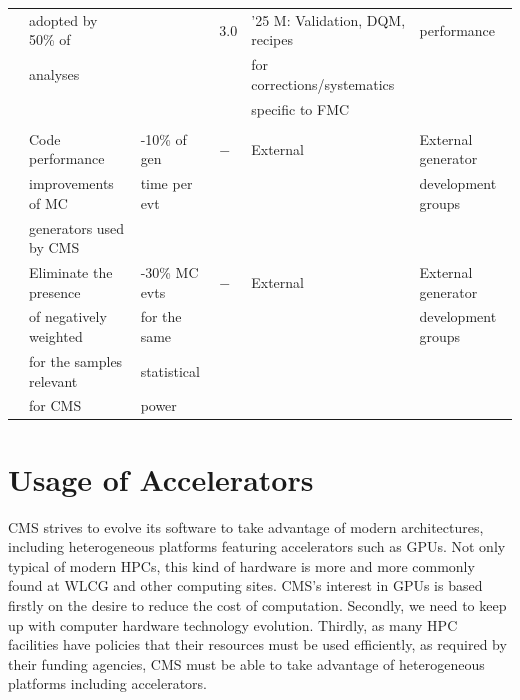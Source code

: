 \documentclass{cmspaper}
\newcommand{\trh}{\cellcolor{tablerowheader}}
\newcounter{magicrownumbers}
\newcommand\rownumber{\refstepcounter{magicrownumbers}\arabic{magicrownumbers}}
\begin{document}
\begin{table}[ht]
{\begin{center}
\begin{tabular}{llllll}
\trh &\trh adopted by 50\% of        &                & 3.0 & '25 M: Validation, DQM, recipes & performance \\
\trh &\trh analyses                  &                &     & for corrections/systematics     &  \\
\trh &\trh                           &                &     & specific to FMC                 &  \\
\hline \hline
\rowcolor{tableheader}\multicolumn{6}{c}{\textit{Generation}} \\ \hline
\rownumber\label{cpu_needs:geninc}
\trh &\trh Code performance       & -10\% of gen & $-$  & External & External generator \\
\trh &\trh improvements of MC     & time per evt &    &          & development groups \\
\trh &\trh generators used by CMS &              &    &          & \\
\hline
\rownumber\label{cpu_needs:negweights}
\trh &\trh Eliminate the presence    & -30\% MC evts & $-$  & External & External generator \\
\trh &\trh of negatively weighted    & for the same  &      &          & development groups \\
\trh &\trh for the samples relevant  & statistical   &      &          &  \\
\trh &\trh for CMS                   & power         &      &          &  \\
\hline
\end{tabular}
\end{center}
}
\end{table}



\section{Usage of Accelerators}
\label{sec:usage_of_accelerators}

CMS strives to evolve its software to take advantage of modern architectures, including heterogeneous platforms featuring accelerators such as GPUs. Not only typical of modern HPCs, this kind of hardware is more and more commonly found at WLCG and other computing sites. CMS's interest in GPUs is based firstly on the desire to reduce the cost of computation. Secondly, we need to keep up with computer hardware technology evolution. Thirdly, as many HPC facilities have policies that their resources must be used efficiently, as required by their funding agencies, CMS must be able to take advantage of heterogeneous platforms including accelerators.
\end{document}
